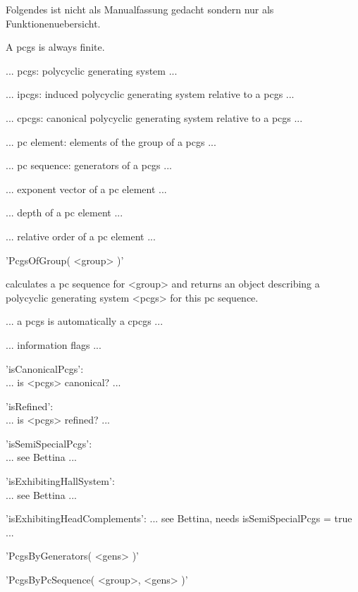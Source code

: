 Folgendes ist nicht als Manualfassung gedacht sondern nur als
Funktionenuebersicht.

A pcgs is always finite.


... pcgs: polycyclic generating system ...

... ipcgs: induced polycyclic generating system relative to a pcgs ...

... cpcgs: canonical polycyclic generating system relative to a pcgs ...

... pc element: elements of the group of a pcgs ...

... pc sequence: generators of a pcgs ...

... exponent vector of a pc element ...

... depth of a pc element ...

... relative order of a pc element ...


'PcgsOfGroup( <group> )'

calculates a  pc sequence for <group> and  returns an object describing a
polycyclic generating system <pcgs> for this pc sequence.

... a pcgs is automatically a cpcgs ...

... information flags ...

'isCanonicalPcgs': \\
    ... is <pcgs> canonical? ...

'isRefined': \\
    ... is <pcgs> refined? ...

'isSemiSpecialPcgs': \\
    ... see Bettina ...

'isExhibitingHallSystem': \\
    ... see Bettina ...

'isExhibitingHeadComplements':
    ... see Bettina, needs isSemiSpecialPcgs = true ...


'PcgsByGenerators( <gens> )'



'PcgsByPcSequence( <group>, <gens> )'

